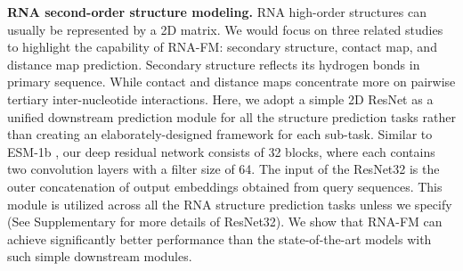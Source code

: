 \textbf{RNA second-order structure modeling.} 
RNA high-order structures can usually be represented by a 2D matrix. We would focus on three related studies to highlight the capability of RNA-FM: secondary structure, contact map, and distance map prediction. Secondary structure reflects its hydrogen bonds in primary sequence. While contact and distance maps concentrate more on pairwise tertiary inter-nucleotide interactions. Here, we adopt a simple 2D ResNet as a unified downstream prediction module for all the structure prediction tasks rather than creating an elaborately-designed framework for each sub-task. Similar to ESM-1b \cite{rives2021biological}, our deep residual network consists of 32 blocks, where each contains two convolution layers with a filter size of 64. The input of the ResNet32 is the outer concatenation of output embeddings obtained from query sequences. This module is utilized across all the RNA structure prediction tasks unless we specify (See Supplementary for more details of ResNet32). We show that RNA-FM can achieve significantly better performance than the state-of-the-art models with such simple downstream modules.



